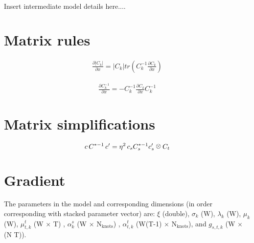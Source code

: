 \documentclass[12pt]{article}
\newcommand{\kron}{\raisebox{1pt}{\ensuremath{\:\otimes\:}}}
\begin{document}
Insert intermediate model details here....


\section{Matrix rules}

\begin{align*}
\frac{\partial |C_k|}{\partial x} = |C_k|tr\left( C_k^{-1}
\frac{\partial C_k}{\partial x} \right)
\end{align*}

\begin{align*}
\frac{\partial C_k^{-1}}{\partial x} = - C_k^{-1}\frac{\partial
C_k}{\partial x} C_k^{-1}
\end{align*}

\section{Matrix simplifications}

\begin{align*}
c \, C^{*-1} \, c' = \eta^2 \, c_s C_s^{*-1} c_s' \kron C_t
\end{align*}




\section{Gradient}

The parameters in the model and corresponding dimensions (in order corresponding with stacked parameter vector) are: $\xi$ (double), $\sigma_k$ (W), $\lambda_k$ (W), $\mu_k$ (W), $\mu_{t,k}^t$ (W $\times$ T) , $\alpha_k^s$ (W $\times$ N$_{\text{knots}}$) , $\alpha_{t,k}^t$ (W(T-1) $\times$ N$_{\text{knots}}$), and $g_{s,t,k}$ (W $\times$ (N T)).
\end{document}
